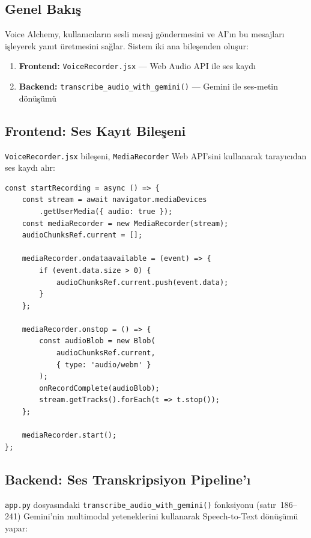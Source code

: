 \documentclass[12pt,a4paper]{article}
\begin{document}
\subsection{Genel Bakış}

Voice Alchemy, kullanıcıların sesli mesaj göndermesini ve AI'ın bu mesajları işleyerek yanıt üretmesini sağlar. Sistem iki ana bileşenden oluşur:

\begin{enumerate}
    \item \textbf{Frontend:} \texttt{VoiceRecorder.jsx} --- Web Audio API ile ses kaydı
    \item \textbf{Backend:} \texttt{transcribe\_audio\_with\_gemini()} --- Gemini ile ses-metin dönüşümü
\end{enumerate}

\subsection{Frontend: Ses Kayıt Bileşeni}

\texttt{VoiceRecorder.jsx} bileşeni, \texttt{MediaRecorder} Web API'sini kullanarak tarayıcıdan ses kaydı alır:

\begin{lstlisting}[style=jsstyle, caption={Ses Kayıt Mekanizması (VoiceRecorder.jsx)}, label=lst:voice]
const startRecording = async () => {
    const stream = await navigator.mediaDevices
        .getUserMedia({ audio: true });
    const mediaRecorder = new MediaRecorder(stream);
    audioChunksRef.current = [];

    mediaRecorder.ondataavailable = (event) => {
        if (event.data.size > 0) {
            audioChunksRef.current.push(event.data);
        }
    };

    mediaRecorder.onstop = () => {
        const audioBlob = new Blob(
            audioChunksRef.current, 
            { type: 'audio/webm' }
        );
        onRecordComplete(audioBlob);
        stream.getTracks().forEach(t => t.stop());
    };

    mediaRecorder.start();
};
\end{lstlisting}

\subsection{Backend: Ses Transkripsiyon Pipeline'ı}

\texttt{app.py} dosyasındaki \texttt{transcribe\_audio\_with\_gemini()} fonksiyonu (satır~186--241) Gemini'nin multimodal yeteneklerini kullanarak Speech-to-Text dönüşümü yapar:
\end{document}
